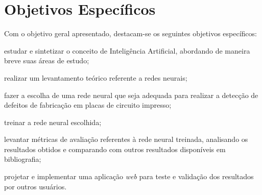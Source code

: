 \section{Objetivos Específicos}

Com o objetivo geral apresentado, destacam-se os seguintes objetivos específicos:

\begin{alineas}
  \item estudar e sintetizar o conceito de Inteligência Artificial, abordando de maneira breve suas áreas de estudo;
  \item realizar um levantamento teórico referente a redes neurais;
  \item fazer a escolha de uma rede neural que seja adequada para realizar a detecção de defeitos de fabricação em placas de circuito impresso;
  \item treinar a rede neural escolhida;
  \item levantar métricas de avaliação referentes à rede neural treinada, analisando os resultados obtidos e comparando com outros resultados disponíveis em bibliografia;
  \item projetar e implementar uma aplicação \textit{web} para teste e validação dos resultados por outros usuários.
\end{alineas}

